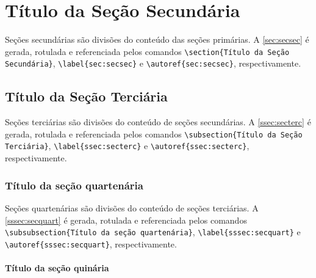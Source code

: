\section{Título da Seção Secundária}\label{sec:secsec}

Seções secundárias são divisões do conteúdo das seções primárias. A \autoref{sec:secsec} é gerada, rotulada e referenciada pelos comandos \verb|\section{Título da Seção Secundária}|, \verb|\label{sec:secsec}| e \verb|\autoref{sec:secsec}|, respectivamente.

\subsection{Título da Seção Terciária}\label{ssec:secterc}

Seções terciárias são divisões do conteúdo de seções secundárias. A \autoref{ssec:secterc} é gerada, rotulada e referenciada pelos comandos \verb|\subsection{Título da Seção Terciária}|, \verb|\label{ssec:secterc}| e \verb|\autoref{ssec:secterc}|, respectivamente.

\subsubsection{Título da seção quartenária}\label{sssec:secquart}

Seções quartenárias são divisões do conteúdo de seções terciárias. A \autoref{sssec:secquart} é gerada, rotulada e referenciada pelos comandos \verb|\subsubsection{Título da seção quartenária}|, \verb|\label{sssec:secquart}| e \verb|\autoref{sssec:secquart}|, respectivamente.

\paragraph{Título da seção quinária}\label{par:secqui}

